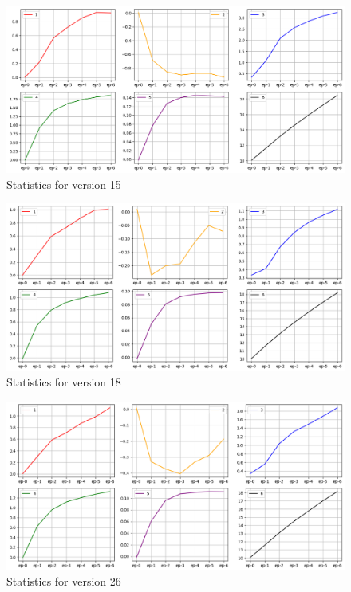 \begin{figure}[!ht]
    \centering
    \includegraphics[width=1.0\textwidth]{img/stats_v15.png}
    \caption{Statistics for version 15}
    \label{fig:stats_v15}
\end{figure}

\begin{figure}[!ht]
    \centering
    \includegraphics[width=1.0\textwidth]{img/stats_v18.png}
    \caption{Statistics for version 18}
    \label{fig:stats_v18}
\end{figure}

\begin{figure}[!ht]
    \centering
    \includegraphics[width=1.0\textwidth]{img/stats_v26.png}
    \caption{Statistics for version 26}
    \label{fig:stats_v26}
\end{figure}



